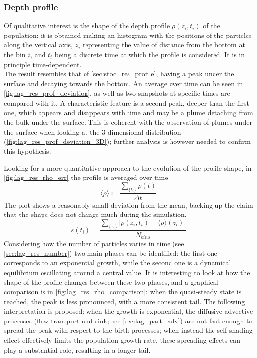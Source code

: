 \subsubsection{Depth profile} \label{sec:lag_res_profile}
Of qualitative interest is the shape of the depth profile $\rho(z_i,t_i)$ of the population: it is obtained making an histogram with the positions of the particles along the vertical axis, $z_i$ representing the value of distance from the bottom at the bin $i$, and $t_i$ being a discrete time at which the profile is considered. It is in principle time-dependent. \\
The result resembles that of \autoref{sec:stoc_res_profile}, having a peak under the surface and decaying towards the bottom. An average over time can be seen in \autoref{fig:lag_res_prof_deviation}, as well as two snapshots at specific times are compared with it. A characteristic feature is a second peak, deeper than the first one, which appears and disappears with time and may be a plume detaching from the bulk under the surface. This is coherent with the observation of plumes under the surface when looking at the 3-dimensional distribution (\autoref{fig:lag_res_prof_deviation_3D}); further analysis is however needed to confirm this hypothesis. 



Looking for a more quantitative approach to the evolution of the profile shape, in \autoref{fig:lag_res_rho_err} the profile is averaged over time
\[ \langle \rho \rangle \coloneqq \frac{\sum_{\{t_i\}} \rho(t)}{\Delta t} \]
The plot shows a reasonably small deviation from the mean, backing up the claim that the shape does not change much during the simulation.%
\[ s(t_i) = \frac{\sum_{\{z_i\}} \left| \rho(z_i,t_i) - \langle \rho \rangle(z_i) \right|}{N_{bins}} \]
Considering how the number of particles varies in time (see \autoref{sec:lag_res_number}) two main phases can be identified: the first one corresponds to an exponential growth, while the second one is a dynamical equilibrium oscillating around a central value. It is interesting to look at how the shape of the profile changes between these two phases, and a graphical comparison is in \autoref{fig:lag_res_rho_comparison}: when the quasi-steady state is reached, the peak is less pronounced, with a more consistent tail. The following interpretation is proposed: when the growth is exponential, the diffusive-advective processes (flow transport and sink; see \autoref{sec:lag_part_adv}) are not fast enough to spread the peak with respect to the birth processes; when instead the self-shading effect effectively limits the population growth rate, these spreading effects can play a substantial role, resulting in a longer tail. 

